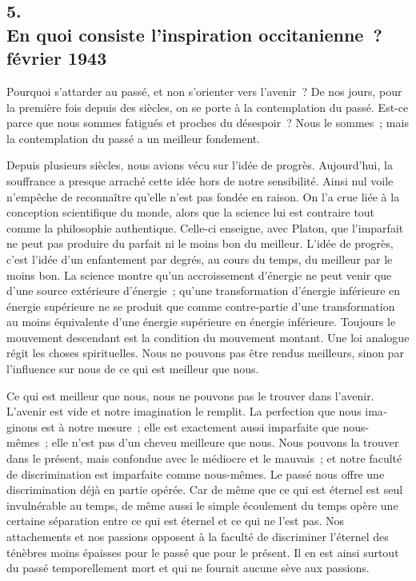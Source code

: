 \documentclass[french,twoside]{book} %
\begin{document}
\begin{center}
\end{center}
\subsection[5. En quoi consiste l’inspiration occitanienne ? février 1943]{5. \\
En quoi consiste l’inspiration occitanienne ? \\
février 1943}
\noindent \par
Pourquoi s'attarder au passé, et non s'orienter vers l'avenir ? De nos jours, pour la première fois depuis des siècles, on se porte à la contemplation du passé. Est-ce parce que nous sommes fatigués et proches du désespoir ? Nous le sommes ; mais la contemplation du passé a un meilleur fondement.\par
Depuis plusieurs siècles, nous avions vécu sur l'idée de progrès. Aujour­d'hui, la souffrance a presque arraché cette idée hors de notre sensibilité. Ainsi nul voile n'empêche de reconnaître qu'elle n'est pas fondée en raison. On l'a crue liée à la conception scientifique du monde, alors que la science lui est contraire tout comme la philosophie authentique. Celle-ci enseigne, avec Platon, que l'imparfait ne peut pas produire du parfait ni le moins bon du meilleur. L'idée de progrès, c'est l'idée d'un enfantement par degrés, au cours du temps, du meilleur par le moins bon. La science montre qu'un accroisse­ment d'énergie ne peut venir que d'une source extérieure d'énergie ; qu'une transformation d'énergie inférieure en énergie supérieure ne se produit que comme contre-partie d'une transformation au moins équivalente d'une énergie supérieure en énergie inférieure. Toujours le mouvement descendant est la condition du mouvement montant. Une loi analogue régit les choses spiri­tuelles. Nous ne pouvons pas être rendus meilleurs, sinon par l'influence sur nous de ce qui est meilleur que nous.\par
Ce qui est meilleur que nous, nous ne pouvons pas le trouver dans l'avenir. L'avenir est vide et notre imagination le remplit. La perfection que nous ima­ginons est à notre mesure ; elle est exactement aussi imparfaite que nous-mêmes ; elle n'est pas d'un cheveu meilleure que nous. Nous pouvons la trouver dans le présent, mais confondue avec le médiocre et le mauvais ; et notre faculté de discrimination est imparfaite comme nous-mêmes. Le passé nous offre une discrimination déjà en partie opérée. Car de même que ce qui est éternel est seul invulnérable au temps, de même aussi le simple écoule­ment du temps opère une certaine séparation entre ce qui est éternel et ce qui ne l'est pas. Nos attachements et nos passions opposent à la faculté de discri­miner l'éternel des ténèbres moins épaisses pour le passé que pour le présent. Il en est ainsi surtout du passé temporellement mort et qui ne fournit aucune sève aux passions.\par
\end{document}
